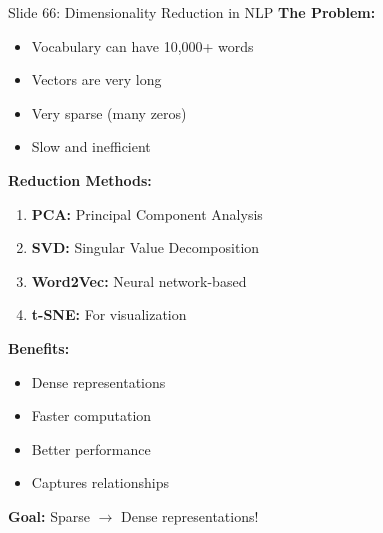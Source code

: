 \documentclass[8pt]{beamer}
\begin{document}
	\begin{frame}{Slide 66: Dimensionality Reduction in NLP}
		\fontsize{6.5}{7.5}\selectfont
		\textbf{The Problem:}
		\begin{itemize}
			\item Vocabulary can have 10,000+ words
			\item Vectors are very long
			\item Very sparse (many zeros)
			\item Slow and inefficient
		\end{itemize}
		
		\vspace{0.1cm}
		\textbf{Reduction Methods:}
		\begin{enumerate}
			\item \textbf{PCA:} Principal Component Analysis
			\item \textbf{SVD:} Singular Value Decomposition
			\item \textbf{Word2Vec:} Neural network-based
			\item \textbf{t-SNE:} For visualization
		\end{enumerate}
		
		\vspace{0.1cm}
		\textbf{Benefits:}
		\begin{itemize}
			\item Dense representations
			\item Faster computation
			\item Better performance
			\item Captures relationships
		\end{itemize}
		
		\textcolor{myblue}{\textbf{Goal:}} Sparse $\to$ Dense representations!
	\end{frame}
	
\end{document}
